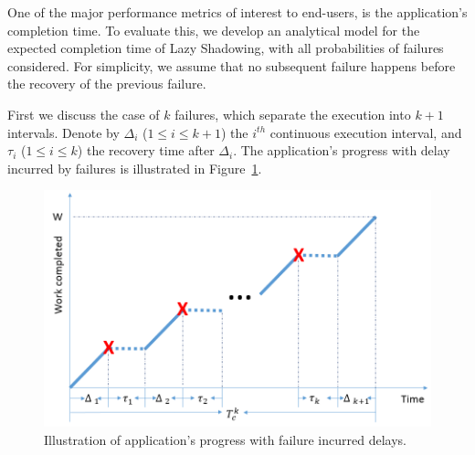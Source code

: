 One of the major performance metrics of interest to end-users, is the application's completion time. 
To evaluate this, we develop an analytical model for the expected completion time of Lazy Shadowing, with all probabilities of failures considered. For simplicity, we assume that no subsequent failure happens before the recovery of the previous failure. 

First we discuss the case of $k$ failures, which separate the execution into $k+1$ intervals. 
Denote by $\Delta_i$ ($1\le i \le k+1$) the $i^{th}$ continuous execution interval, and $\tau_i$ ($1\le i \le k$) the recovery time after $\Delta_i$. 
The application's progress with delay incurred by failures is illustrated in Figure~\ref{fig:progress}.

\begin{figure}[!t]
	\begin{center}
		\includegraphics[width=0.7\columnwidth]{Figures/progress}
	\end{center}
	\caption{Illustration of application's progress with failure incurred delays.}
	\label{fig:progress}
\end{figure}

